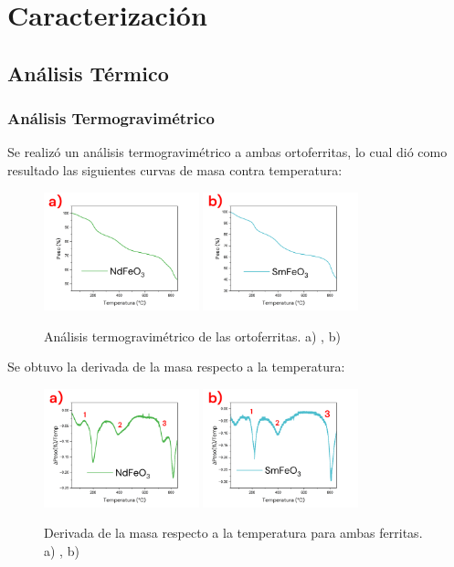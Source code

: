 \documentclass[../main.tex]{subfiles}
\begin{document}
\section{Caracterización}
\subsection{Análisis Térmico} \label{sec:analisistermico}
\subsubsection{Análisis Termogravimétrico} \label{sec:TGA}
Se realizó un análisis termogravimétrico a ambas ortoferritas, lo cual dió como resultado las siguientes curvas de masa contra temperatura:
\begin{figure}[H]
    \centering
    \includegraphics[width=0.4\textwidth]{fig/TGA-NdFeO3.png}
    \quad
    \includegraphics[width=0.4\textwidth]{fig/TGA-SmFeO3.png}
    \caption{Análisis termogravimétrico de las ortoferritas. a) \neod{}, b) \sama{}}
    \label{fig:TGAres}
\end{figure}
Se obtuvo la derivada de la masa respecto a la temperatura:
\begin{figure}[H]
    \centering
    \includegraphics[width=0.4\textwidth]{fig/TGA-derNdFeO3.png}
    \quad
    \includegraphics[width=0.4\textwidth]{fig/TGA-derSmFeO3.png}
    \caption{Derivada de la masa respecto a la temperatura para ambas ferritas. a) \neod{}, b) \sama{}}
    \label{fig:derTGAres}
\end{figure}
\end{document}
